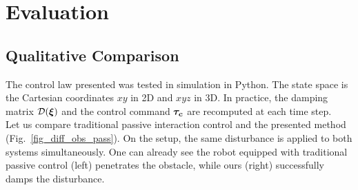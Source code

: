 \documentclass[conference]{IEEEtran}
\begin{document}

\section{Evaluation}  \label{sec:evaluation}
\subsection{Qualitative Comparison} \label{sec:qual_comp}
The control law presented was tested in simulation in Python. The state space is the Cartesian coordinates $xy$ in 2D and $xyz$ in 3D. In practice, the damping matrix $\mathcal{D}(\boldsymbol{\xi})$ and the control command $\boldsymbol{\tau_c}$ are recomputed at each time step.\\

Let us compare traditional passive interaction control and the presented method (Fig.~\ref{fig_diff_obs_pass}). On the setup, the same disturbance is applied to both systems simultaneously. One can already see the robot equipped with traditional passive control (left) penetrates the obstacle, while ours (right) successfully damps the disturbance.
\end{document}
